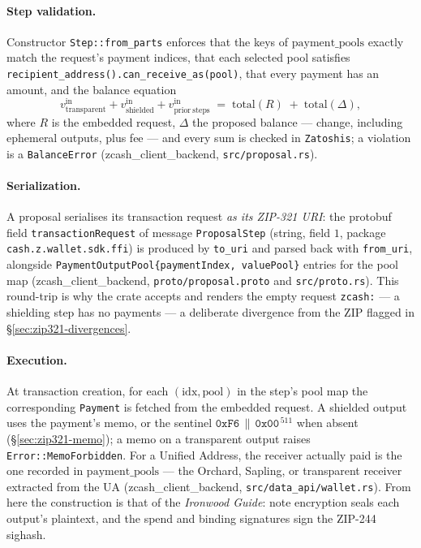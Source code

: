 \documentclass[11pt,a4paper]{article}
\theoremstyle{definition}
\begin{document}
\paragraph{Step validation.} Constructor \texttt{Step::from\_parts} enforces
that the keys of $\mathrm{payment\_pools}$ exactly match the request's
payment indices, that each selected pool satisfies
\texttt{recipient\_address()}\allowbreak\texttt{.can\_receive\_as(pool)},
that every payment has an amount, and the balance equation
\begin{equation}\label{eq:zip321-balance}
v^{\mathrm{in}}_{\mathrm{transparent}}
+ v^{\mathrm{in}}_{\mathrm{shielded}}
+ v^{\mathrm{in}}_{\mathrm{prior\ steps}}
\;=\;
\mathrm{total}(R) \;+\; \mathrm{total}(\Delta),
\end{equation}
where $R$ is the embedded request, $\Delta$ the proposed balance ---
change, including ephemeral outputs, plus fee --- and every sum is checked
in \texttt{Zatoshis}; a violation is a \texttt{BalanceError}
(\textsf{zcash\_client\_backend}, \texttt{src/proposal.rs}).

\paragraph{Serialization.} A proposal serialises its transaction request
\emph{as its ZIP-321 URI}: the protobuf field \texttt{transactionRequest}
of message \texttt{ProposalStep} (string, field $1$, package
\texttt{cash.z.wallet.sdk.ffi}) is produced by \texttt{to\_uri} and parsed
back with \texttt{from\_uri}, alongside
\texttt{PaymentOutputPool\{paymentIndex, valuePool\}} entries for the pool
map (\textsf{zcash\_client\_backend}, \texttt{proto/proposal.proto} and
\texttt{src/proto.rs}). This round-trip is why the crate accepts and renders
the empty request \texttt{zcash:} --- a shielding step has no payments ---
a deliberate divergence from the ZIP flagged in
\S\ref{sec:zip321-divergences}.

\paragraph{Execution.} At transaction creation, for each
$(\mathrm{idx}, \mathrm{pool})$ in the step's pool map the corresponding
\texttt{Payment} is fetched from the embedded request. A shielded output
uses the payment's memo, or the sentinel
$\mathtt{0xF6} \,\|\, \mathtt{0x00}^{\,511}$ when absent
(\S\ref{sec:zip321-memo}); a memo on a transparent output raises
\texttt{Error::MemoForbidden}. For a Unified Address, the receiver actually
paid is the one recorded in $\mathrm{payment\_pools}$ --- the Orchard,
Sapling, or transparent receiver extracted from the UA
(\textsf{zcash\_client\_backend}, \texttt{src/data\_api/wallet.rs}). From
here the construction is that of the \emph{Ironwood Guide}: note encryption
seals each output's plaintext, and the spend and binding signatures sign the
ZIP-244 sighash.
\end{document}
